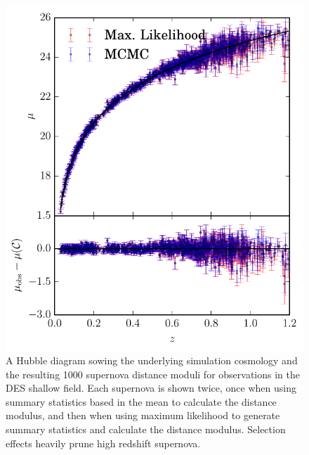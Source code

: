 \documentclass[a4paper,fleqn,usenatbib]{mnras}
\begin{document}
\begin{figure}
	\includegraphics[width=\columnwidth]{../output/obs_cosmology_shallow.pdf}
	\caption{A Hubble diagram sowing the underlying simulation cosmology and the resulting 1000 supernova distance moduli for observations in the DES shallow field. Each supernova is shown twice, once when using summary statistics based in the mean to calculate the distance modulus, and then when using maximum likelihood to generate summary statistics and calculate the distance modulus. Selection effects heavily prune high redshift supernova.}
	\label{fig:obs_cosmology_shallow}
\end{figure}
\end{document}
